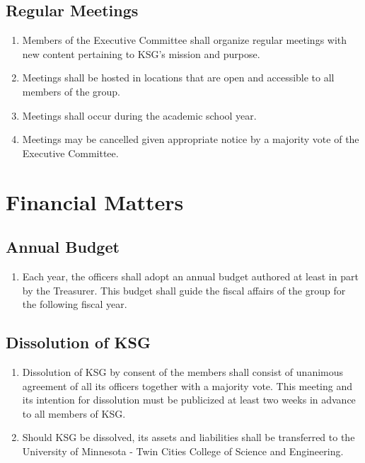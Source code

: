 \documentclass[12pt,executivepaper]{article}
\begin{document}
\subsection{Regular Meetings}
\begin{enumerate}
    \item Members of the Executive Committee shall organize regular meetings
          with new content pertaining to KSG's mission and purpose.
    \item Meetings shall be hosted in locations that are open and accessible
          to all members of the group.
    \item Meetings shall occur during the academic school year.
    \item Meetings may be cancelled given appropriate notice by a majority
          vote of the Executive Committee.
\end{enumerate}

\section{Financial Matters}

\subsection{Annual Budget}
\begin{enumerate}
    \item Each year, the officers shall adopt an annual budget authored at least in
          part by the Treasurer. This budget shall guide the fiscal affairs of the
          group for the following fiscal year.
\end{enumerate}

\subsection{Dissolution of KSG}
\begin{enumerate}
    \item Dissolution of KSG by consent of the members shall consist of unanimous
          agreement of all its officers together with a majority vote.
          This meeting and its intention for dissolution must be publicized at least
          two weeks in advance to all members of KSG.
    \item Should KSG be dissolved, its assets and liabilities shall be transferred
          to the University of Minnesota - Twin Cities College of Science and Engineering.
\end{enumerate}
\end{document}
